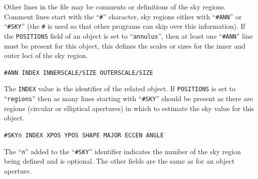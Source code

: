 \documentclass[twoside,11pt]{article}
\renewcommand{\_}{\texttt{\symbol{95}}}
\newcommand{\ft}[1]{``\texttt{#1}''}
\begin{document}
{{{       Other lines in the file may be comments or definitions of the sky
       regions. Comment lines start with the \ft{\#} character, sky regions
       either with \ft{\#ANN} or \ft{\#SKY} (the \texttt{\#} is used so that other
       programs can skip over this information). If the \texttt{POSITIONS} field
       of an object is set to \ft{annulus}, then at least one \ft{\#ANN} line must
       be present for this object, this defines the scales or sizes for
       the inner and outer loci of the sky region.
       \begin{description}
          \item  \hspace*{1cm} \texttt{\#ANN INDEX INNER\_SCALE/SIZE OUTER\_SCALE/SIZE}
       \end{description}
       The \texttt{INDEX} value is the identifier of the related object. If
       \texttt{POSITIONS} is set to \ft{regions} then as many lines
       starting with \ft{\#SKY} should be present as there are
       regions (circular or elliptical apertures) in which to estimate
       the sky value for this object.
       \begin{description}
         \item  \hspace*{1cm}  \texttt{\#SKYn INDEX XPOS YPOS SHAPE MAJOR ECCEN ANGLE}
       \end{description}
       The \ft{n} added to the \ft{\#SKY} identifier indicates
       the number of the sky region being defined and is optional.
       The other fields are the same as for an object aperture.\\

}}}
\end{document}
